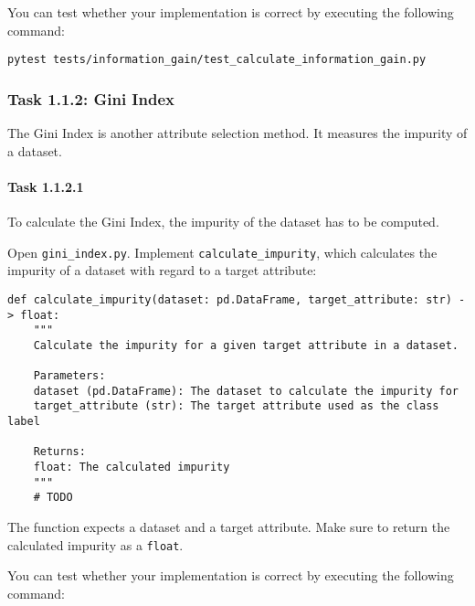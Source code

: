 \documentclass[
english,
smallborders
]{i6prcsht}
\begin{document}
You can test whether your implementation is correct by executing the following command:

\vspace*{0.3cm}

\begin{lstlisting}
pytest tests/information_gain/test_calculate_information_gain.py
\end{lstlisting}

\vspace*{0.1cm}

\subsubsection*{Task 1.1.2: Gini Index}

The Gini Index is another attribute selection method. It measures the impurity of a dataset.

\paragraph*{Task 1.1.2.1} \hfill

To calculate the Gini Index, the impurity of the dataset has to be computed.

Open \texttt{gini\_index.py}. Implement \texttt{calculate\_impurity}, which calculates the impurity of a dataset with regard to a target attribute:

\vspace*{0.3cm}

\begin{lstlisting}
def calculate_impurity(dataset: pd.DataFrame, target_attribute: str) -> float:
    """
    Calculate the impurity for a given target attribute in a dataset.

    Parameters:
    dataset (pd.DataFrame): The dataset to calculate the impurity for
    target_attribute (str): The target attribute used as the class label

    Returns:
    float: The calculated impurity
    """
    # TODO
\end{lstlisting}

\vspace*{0.1cm}

The function expects a dataset and a target attribute. Make sure to return the calculated impurity as a \texttt{float}.

You can test whether your implementation is correct by executing the following command:

\vspace*{0.3cm}
\end{document}
